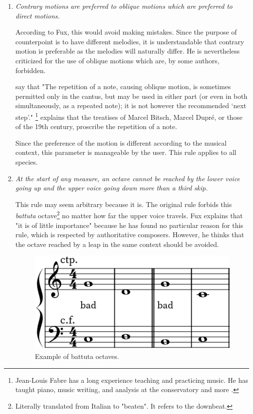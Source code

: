 \begin{enumerate}[wide, label=\bfseries 1.P\arabic*]
    \item\label{rule:codmotions} \textit{Contrary motions are preferred to oblique motions which are preferred to direct motions.} \parencite[p.53]{GaPFr}
    
    According to Fux, this would avoid making mistakes. Since the purpose of counterpoint is to have different melodies, it is understandable that contrary motion is preferable as the melodies will naturally differ. He is nevertheless criticized for the use of oblique motions which are, by some authors, forbidden.

    \textcite{CpSachs} say that "The repetition of a note, causing oblique motion, is sometimes permitted only in the cantus, but may be used in either part (or even in both simultaneously, as a repeated note); it is not however the recommended ‘next step’."
    \textcite{ReglesJLFabre}\footnote{Jean-Louis Fabre has a long experience teaching and practicing music. He has taught piano, music writing, and analysis at the conservatory and more \parencite{BioJLFabre}.} explains that the treatises of Marcel Bitsch\parencite{Bitsch}, Marcel Dupré\parencite{Dupre}, or those of the 19th century, proscribe the repetition of a note.

    Since the preference of the motion is different according to the musical context, this parameter is manageable by the user. This rule applies to all species.
    
    \item\label{rule:battuta} \textit{At the start of any measure, an octave cannot be reached by the lower voice going up and the upper voice going down more than a third skip.} \parencite[p.61-62]{GaPFr}

    This rule may seem arbitrary because it is. The original rule forbids this \textit{battuta} octave\footnote{Literally translated from Italian to "beaten". It refers to the downbeat.} no matter how far the upper voice travels. Fux explains that "it is of little importance"\parencite[p.39]{GaPEng} because he has found no particular reason for this rule, which is respected by authoritative composers. However, he thinks that the octave reached by a leap in the same context should be avoided.
    \begin{figure}[h]
        \centering
        \includegraphics[height=\fh]{Images/battutas.png}
        \caption{Example of battuta octaves.}
        \label{fig:battuta}
    \end{figure}


\end{enumerate}
